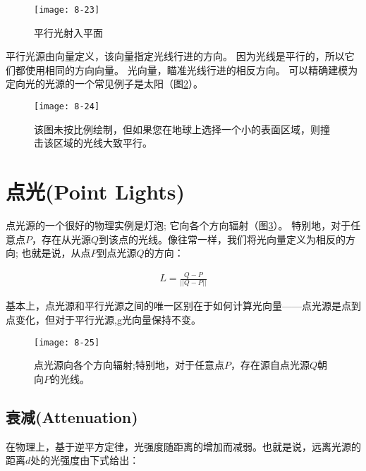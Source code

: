\begin{figure}[h]
    \label{fig:8-23}
    \texttt{[image: 8-23]}
    \centering
    \caption{平行光射入平面}
\end{figure}

\begin{flushleft}
平行光源由向量定义，该向量指定光线行进的方向。 因为光线是平行的，所以它们都使用相同的方向向量。 光向量，瞄准光线行进的相反方向。 可以精确建模为定向光的光源的一个常见例子是太阳（图\ref{fig:8-24}）。
\end{flushleft}

\begin{figure}[h]
    \label{fig:8-24}
    \texttt{[image: 8-24]}
    \centering
    \caption{该图未按比例绘制，但如果您在地球上选择一个小的表面区域，则撞击该区域的光线大致平行。}
\end{figure}

\section{点光(Point Lights)}
\begin{flushleft}
点光源的一个很好的物理实例是灯泡; 它向各个方向辐射（图\ref{fig:8-25}）。 特别地，对于任意点$P$，存在从光源$Q$到该点的光线。像往常一样，我们将光向量定义为相反的方向; 也就是说，从点$P$到点光源$Q$的方向：\\
\end{flushleft}

\begin{align*}
L=\frac{Q-P}{||Q-P||}
\end{align*}

\begin{flushleft}
基本上，点光源和平行光源之间的唯一区别在于如何计算光向量——点光源是点到点变化，但对于平行光源,g光向量保持不变。
\end{flushleft}

\begin{figure}[h]
    \label{fig:8-25}
    \texttt{[image: 8-25]}
    \centering
    \caption{点光源向各个方向辐射;特别地，对于任意点$P$，存在源自点光源$Q$朝向$P$的光线。}
\end{figure}

\subsection{衰减(Attenuation)}
\begin{flushleft}
在物理上，基于逆平方定律，光强度随距离的增加而减弱。也就是说，远离光源的距离$d$处的光强度由下式给出：\\
\end{flushleft}

